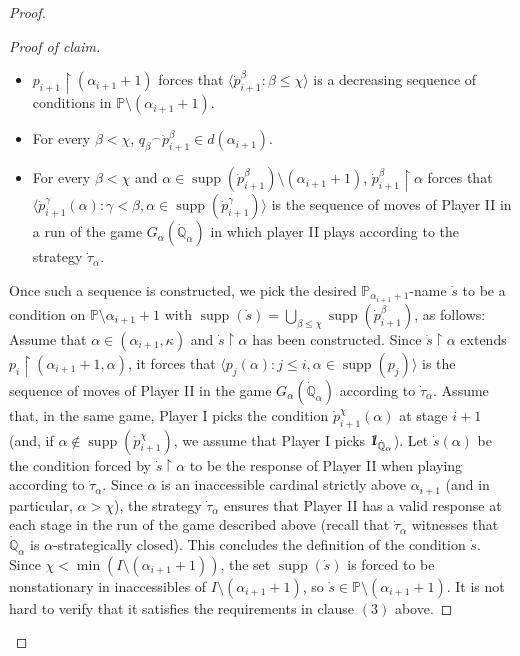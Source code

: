 \documentclass[10pt,a4paper]{amsart}
\newcommand{\la}{\langle}
\newcommand{\one}{\mathop{1\hskip-3pt {\rm l}}}
\newcommand{\po}{\mathbb{P}}
\newcommand{\qo}{\mathbb{Q}}
\newcommand{\ra}{\rangle}
\renewcommand{\restriction}{\mathbin\upharpoonright}    %
\DeclareMathOperator{\supp}{supp}
\begin{document}
\begin{proof}
\begin{proof}[Proof of claim]
   \begin{itemize}
       \item $p_{i+1}\restriction (\alpha_{i+1}+1)$ forces that $\la \dot{p}^\beta_{i+1} \colon \beta\leq\chi \ra$ is a decreasing sequence of conditions in $\mathbb{P}\setminus (\alpha_{i+1}+1).$
       \item For every $\beta<\chi$, ${q_\beta}^{\frown} \dot{p}^{\beta}_{i+1}\in d(\alpha_{i+1})$.
       \item For every $\beta<\chi$ and $\alpha\in \supp(\dot{p}^\beta_{i+1})\setminus (\alpha_{i+1}+1)$, $\dot{p}^{\beta}_{i+1}\restriction \alpha$ forces that $\la \dot{p}^\gamma_{i+1}(\alpha) \colon \gamma<\beta, \alpha\in \supp(\dot{p}^\gamma_{i+1}) \ra$ is the sequence of moves of Player II in a run of the game $G_\alpha(\dot{\qo}_\alpha)$ in which player II plays according to the strategy $\dot{\tau}_\alpha$. 
   \end{itemize}
   Once such a sequence is constructed, we pick the desired $\po_{\alpha_{i+1}+1}$-name $\dot{s}$ to be a condition on $\po\setminus \alpha_{i+1}+1$ with $\supp(\dot{s}) = \bigcup_{\beta\leq \chi} \supp(\dot{p}^\beta_{i+1})$, as follows: Assume that $\alpha\in (\alpha_{i+1}, \kappa)$ and $\dot{s}\restriction \alpha$ has been constructed. Since $\dot{s}\restriction \alpha$ extends ${p}_{i}\restriction (\alpha_{i+1}+1,\alpha)$, it forces that $\la p_{j}(\alpha) \colon j\leq i, \alpha\in \supp(p_j)\ra$ is the sequence of moves of Player II in the game $G_\alpha(\dot{\qo}_\alpha)$ according to $\dot{\tau}_\alpha$. Assume that, in the same game, Player I picks the condition $\dot{p}^\chi_{i+1}(\alpha)$ at stage $i+1$ (and, if $\alpha\notin \supp(\dot{p}^\chi_{i+1})$, we assume that Player I picks $\one_{\dot{\qo}_\alpha}$). Let $\dot{s}(\alpha)$ be the condition forced by $\dot{s}\restriction \alpha$ to be the response of Player II when playing according to $\dot{\tau}_\alpha$. Since $\alpha$ is an inaccessible cardinal strictly above $\alpha_{i+1}$ (and in particular,  $\alpha>\chi$), the strategy $\dot{\tau}_\alpha$ ensures that Player II has a valid response at each stage in the run of the game described above (recall that $\dot{\tau}_\alpha$ witnesses that $\dot{\qo}_\alpha$ is $\alpha$-strategically closed). This concludes the definition of the condition $\dot{s}$. Since $\chi < \min(I\setminus (\alpha_{i+1}+1))$, the set $\supp(\dot{s})$ is forced to be nonstationary in inaccessibles of $I\setminus (\alpha_{i+1}+1)$, so $\dot{s}\in \po\setminus (\alpha_{i+1}+1)$. It is  not hard to verify that it satisfies the requirements in clause $(3)$ above. 
   

\end{proof}
\end{proof}
\end{document}
